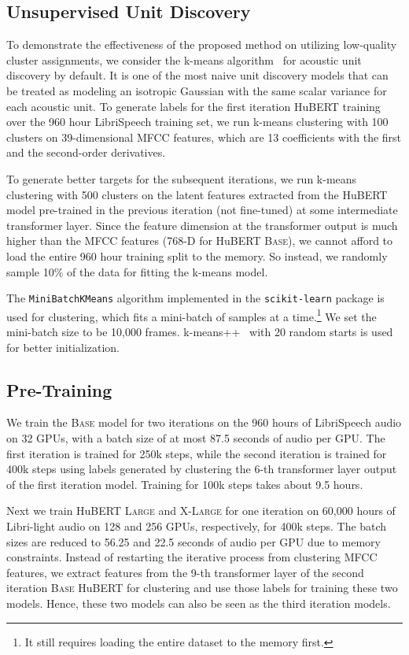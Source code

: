 \subsection{Unsupervised Unit Discovery} To demonstrate the effectiveness of the proposed method on utilizing low-quality cluster assignments, we consider the k-means algorithm~\cite{lloyd1982least} for acoustic unit discovery by default. It is one of the most naive unit discovery models that can be treated as modeling an isotropic Gaussian with the same scalar variance for each acoustic unit. To generate labels for the first iteration HuBERT training over the 960 hour LibriSpeech training set, we run k-means clustering with 100 clusters on 39-dimensional MFCC features, which are 13 coefficients with the first and the second-order derivatives.

To generate better targets for the subsequent iterations, we run k-means clustering with 500 clusters on the latent features extracted from the HuBERT model pre-trained in the previous iteration (not fine-tuned) at some intermediate transformer layer. Since the feature dimension at the transformer output is much higher than the MFCC features (768-D for HuBERT \textsc{Base}), we cannot afford to load the entire 960 hour training split to the memory. So instead, we randomly sample 10\% of the data for fitting the k-means model.

The \texttt{MiniBatchKMeans} algorithm implemented in the \texttt{scikit-learn} \cite{pedregosa2011scikit} package is used for clustering, which fits a mini-batch of samples at a time.\footnote{It still requires loading the entire dataset to the memory first.} We set the mini-batch size to be 10,000 frames. k-means++~\cite{arthur2006k} with 20 random starts is used for better initialization.

\subsection{Pre-Training}\label{sec:pretrain}
We train the \textsc{Base} model for two iterations on the 960 hours of LibriSpeech audio on 32 GPUs, with a batch size of at most 87.5 seconds of audio per GPU. The first iteration is trained for 250k steps, while the second iteration is trained for 400k steps using labels generated by clustering the 6-th transformer layer output of the first iteration model. Training for 100k steps takes about 9.5 hours.

Next we train HuBERT \textsc{Large} and \textsc{X-Large} for one iteration on 60,000 hours of Libri-light audio on 128 and 256 GPUs, respectively, for 400k steps. The batch sizes are reduced to 56.25 and 22.5 seconds of audio per GPU due to memory constraints. Instead of restarting the iterative process from clustering MFCC features, we extract features from the 9-th transformer layer of the second iteration \textsc{Base} HuBERT for clustering and use those labels for training these two models. Hence, these two models can also be seen as the third iteration models.

